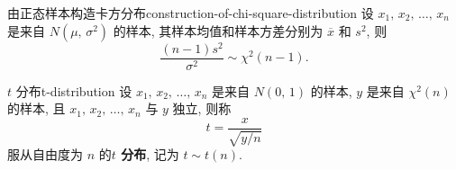 \begin{newtheorembox}{由正态样本构造卡方分布}{construction-of-chi-square-distribution}
	设 $x_1,\,x_2,\,\dots,\,x_n$ 是来自 $N(\mu,\,\sigma^2)$ 的样本, 其样本均值和样本方差分别为 $\overline{x}$ 和 $s^2$, 则
	\[
		\frac{(n-1)s^2}{\sigma^2}\sim\chi^2(n-1).
	\]
\end{newtheorembox}

\begin{newdefbox}{$t$ 分布}{t-distribution}
	设 $x_1,\,x_2,\,\dots,\,x_n$ 是来自 $N(0,\,1)$ 的样本, $y$ 是来自 $\chi^2(n)$ 的样本, 且 $x_1,\,x_2,\,\dots,\,x_n$ 与 $y$ 独立, 则称
	\[
		t=\frac{x}{\sqrt{y/n}}
	\]
	服从自由度为 $n$ 的\textbf{$t$ 分布}, 记为 $t\sim t(n)$.
\end{newdefbox}